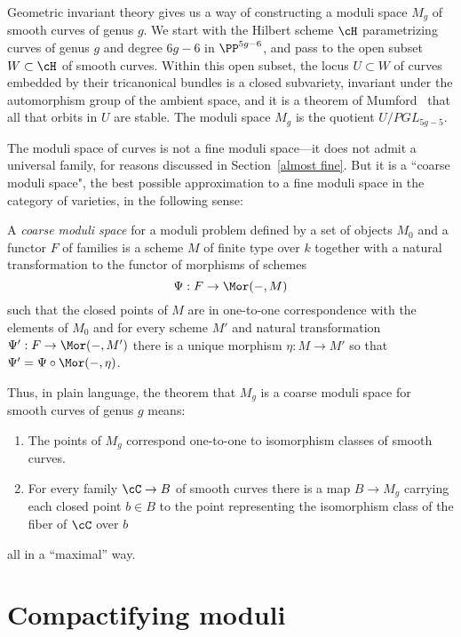 Geometric invariant theory gives us a way of constructing a moduli space $M_g$ of smooth  curves of genus $g$. We start with the Hilbert scheme $\cH$ parametrizing curves of genus $g$ and degree $6g-6$ in $\PP^{5g-6}$, and pass to the open subset $W \subset \cH$ of smooth curves. Within this open subset, the locus $U \subset W$ of curves embedded by their tricanonical bundles is a closed subvariety, invariant under the automorphism group of the ambient space, and it is a theorem of Mumford~\cite{GIT} that all that orbits in $U$ are stable. The moduli space $M_g$ is the quotient $U/PGL_{5g-5}$.

The moduli space of curves is not a fine moduli space---it does not admit a universal family, for reasons discussed in Section~\ref{almost fine}. But it is a ``coarse moduli space", the best possible approximation to a fine moduli space in the category of varieties, in the following sense:

\begin{definition}
A \emph{coarse moduli space} for a moduli problem defined by a set of objects $M_0$ and a functor $F$ of families is a scheme $M$ of finite type over $k$ together with 
a natural transformation to the functor of morphisms of schemes
$$
\Psi: F\to \Mor(-, M)
$$
such that the closed points of $M$ are in one-to-one correspondence with the elements of $M_0$ and
for every scheme $M'$ and natural transformation $\Psi': F \to \Mor(-, M')$
there is a unique morphism $\eta: M\to M'$ so that $\Psi' = \Psi\circ \Mor(-, \eta)$.
\end{definition}


Thus, in plain language, the theorem that $M_g$ is a coarse moduli space for smooth curves of genus $g$ means: 
\begin{enumerate}
 \item The points of $M_g$ correspond one-to-one to isomorphism classes of smooth curves.
 \item For every family $\cC \to B$ of smooth curves there is a map $B\to M_g$ carrying
 each closed point  $b \in B$ to the point representing the isomorphism class of the fiber of $\cC$ over $b$
\end{enumerate}
all in a ``maximal'' way.

\section{Compactifying moduli}

